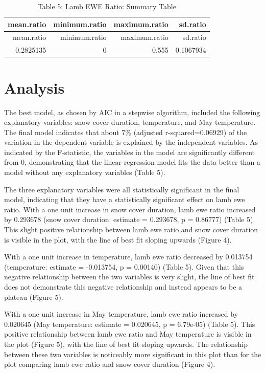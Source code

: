 \documentclass[
  12pt,
]{article}
\begin{document}
\begin{longtable}[]{@{}rrrr@{}}
\caption{Table 5: Lamb EWE Ratio: Summary Table}\tabularnewline
\toprule
mean.ratio & minimum.ratio & maximum.ratio & sd.ratio \\
\midrule
\endfirsthead
\toprule
mean.ratio & minimum.ratio & maximum.ratio & sd.ratio \\
\midrule
\endhead
0.2825135 & 0 & 0.555 & 0.1067934 \\
\bottomrule
\end{longtable}

\newpage

\hypertarget{analysis}{%
\section{Analysis}\label{analysis}}

The best model, as chosen by AIC in a stepwise algorithm, included the
following explanatory variables: snow cover duration, temperature, and
May temperature. The final model indicates that about 7\% (adjusted
r-squared=0.06929) of the variation in the dependent variable is
explained by the independent variables. As indicated by the F-statistic,
the variables in the model are significantly different from 0,
demonstrating that the linear regression model fits the data better than
a model without any explanatory variables (Table 5).

The three explanatory variables were all statistically significant in
the final model, indicating that they have a statistically significant
effect on lamb ewe ratio. With a one unit increase in snow cover
duration, lamb ewe ratio increased by 0.293678 (snow cover duration:
estimate = 0.293678, p = 0.86777) (Table 5). This slight positive
relationship between lamb ewe ratio and snow cover duration is visible
in the plot, with the line of best fit sloping upwards (Figure 4).

With a one unit increase in temperature, lamb ewe ratio decreased by
0.013754 (temperature: estimate = -0.013754, p = 0.00140) (Table 5).
Given that this negative relationship between the two variables is very
slight, the line of best fit does not demonstrate this negative
relationship and instead appears to be a plateau (Figure 5).

With a one unit increase in May temperature, lamb ewe ratio increased by
0.020645 (May temperature: estimate = 0.020645, p = 6.79e-05) (Table 5).
This positive relationship between lamb ewe ratio and May temperature is
visible in the plot (Figure 5), with the line of best fit sloping
upwards. The relationship between these two variables is noticeably more
significant in this plot than for the plot comparing lamb ewe ratio and
snow cover duration (Figure 4).
\end{document}
